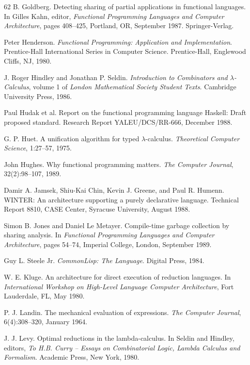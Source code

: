 \begin{thebibliography}{62}
B. Goldberg.
Detecting sharing of partial applications in functional languages.
In Gilles Kahn, editor, \emph{Functional Programming Languages and Computer
Architecture}, pages 408--425, Portland, OR, September 1987. Springer-Verlag.

Peter Henderson.
\emph{Functional Programming: Application and Implementation}.
Prentice-Hall International Series in Computer Science. Prentice-Hall,
Englewood Cliffs, NJ, 1980.

J. Roger Hindley and Jonathan P. Seldin.
\emph{Introduction to Combinators and \(\lambda\)-Calculus}, volume 1 of \emph{London
Mathematical Society Student Texts}.
Cambridge University Press, 1986.

Paul Hudak et al.
Report on the functional programming language Haskell: Draft proposed standard.
Research Report YALEU/DCS/RR-666, December 1988.

G. P. Huet.
A unification algorithm for typed \(\lambda\)-calculus.
\emph{Theoretical Computer Science}, 1:27--57, 1975.

John Hughes.
Why functional programming matters.
\emph{The Computer Journal}, 32(2):98--107, 1989.

Damir A. Jamsek, Shiu-Kai Chin, Kevin J. Greene, and Paul R. Humenn.
WINTER: An architecture supporting a purely declarative language.
Technical Report 8810, CASE Center, Syracuse University, August 1988.

Simon B. Jones and Daniel Le Metayer.
Compile-time garbage collection by sharing analysis.
In \emph{Functional Programming Languages and Computer Architecture}, pages
54--74, Imperial College, London, September 1989.

Guy L. Steele Jr.
\emph{CommonLisp: The Language}.
Digital Press, 1984.

W. E. Kluge.
An architecture for direct execution of reduction languages.
In \emph{International Workshop on High-Level Language Computer Architecture},
Fort Lauderdale, FL, May 1980.

P. J. Landin.
The mechanical evaluation of expressions.
\emph{The Computer Journal}, 6(4):308--320, January 1964.

J. J. Levy.
Optimal reductions in the lambda-calculus.
In Seldin and Hindley, editors, \emph{To H.B. Curry -- Essays on Combinatorial
Logic, Lambda Calculus and Formalism}. Academic Press, New York, 1980.


\end{thebibliography}
